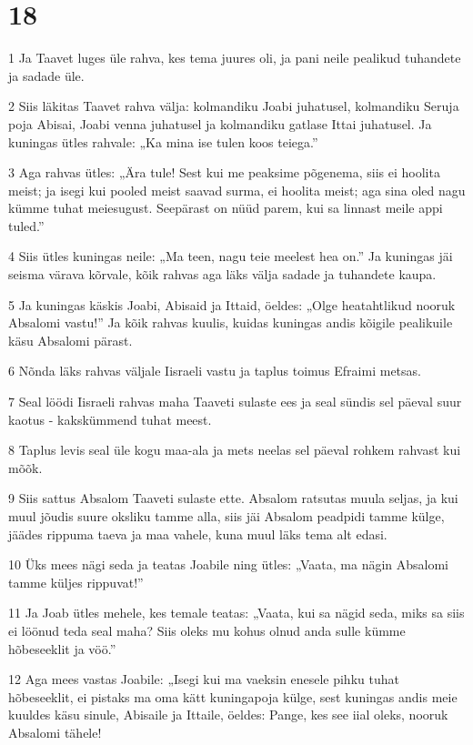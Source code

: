 \chapter{18}

\par 1 Ja Taavet luges üle rahva, kes tema juures oli, ja pani neile pealikud tuhandete ja sadade üle.
\par 2 Siis läkitas Taavet rahva välja: kolmandiku Joabi juhatusel, kolmandiku Seruja poja Abisai, Joabi venna juhatusel ja kolmandiku gatlase Ittai juhatusel. Ja kuningas ütles rahvale: „Ka mina ise tulen koos teiega.”
\par 3 Aga rahvas ütles: „Ära tule! Sest kui me peaksime põgenema, siis ei hoolita meist; ja isegi kui pooled meist saavad surma, ei hoolita meist; aga sina oled nagu kümme tuhat meiesugust. Seepärast on nüüd parem, kui sa linnast meile appi tuled.”
\par 4 Siis ütles kuningas neile: „Ma teen, nagu teie meelest hea on.” Ja kuningas jäi seisma värava kõrvale, kõik rahvas aga läks välja sadade ja tuhandete kaupa.
\par 5 Ja kuningas käskis Joabi, Abisaid ja Ittaid, öeldes: „Olge heatahtlikud nooruk Absalomi vastu!” Ja kõik rahvas kuulis, kuidas kuningas andis kõigile pealikuile käsu Absalomi pärast.
\par 6 Nõnda läks rahvas väljale Iisraeli vastu ja taplus toimus Efraimi metsas.
\par 7 Seal löödi Iisraeli rahvas maha Taaveti sulaste ees ja seal sündis sel päeval suur kaotus - kakskümmend tuhat meest.
\par 8 Taplus levis seal üle kogu maa-ala ja mets neelas sel päeval rohkem rahvast kui mõõk.
\par 9 Siis sattus Absalom Taaveti sulaste ette. Absalom ratsutas muula seljas, ja kui muul jõudis suure oksliku tamme alla, siis jäi Absalom peadpidi tamme külge, jäädes rippuma taeva ja maa vahele, kuna muul läks tema alt edasi.
\par 10 Üks mees nägi seda ja teatas Joabile ning ütles: „Vaata, ma nägin Absalomi tamme küljes rippuvat!”
\par 11 Ja Joab ütles mehele, kes temale teatas: „Vaata, kui sa nägid seda, miks sa siis ei löönud teda seal maha? Siis oleks mu kohus olnud anda sulle kümme hõbeseeklit ja vöö.”
\par 12 Aga mees vastas Joabile: „Isegi kui ma vaeksin enesele pihku tuhat hõbeseeklit, ei pistaks ma oma kätt kuningapoja külge, sest kuningas andis meie kuuldes käsu sinule, Abisaile ja Ittaile, öeldes: Pange, kes see iial oleks, nooruk Absalomi tähele!
